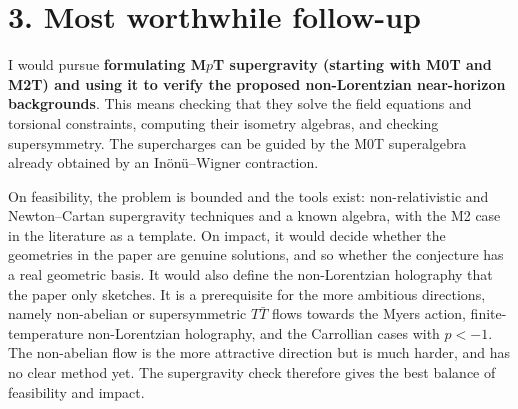 \documentclass[11pt]{article}
\begin{document}
\section*{3. Most worthwhile follow-up}
I would pursue \textbf{formulating M$p$T supergravity (starting with M0T and M2T) and using it to verify the proposed non-Lorentzian near-horizon backgrounds}. This means checking that they solve the field equations and torsional constraints, computing their isometry algebras, and checking supersymmetry. The supercharges can be guided by the M0T superalgebra already obtained by an In\"on\"u--Wigner contraction.

On feasibility, the problem is bounded and the tools exist: non-relativistic and Newton--Cartan supergravity techniques and a known algebra, with the M2 case in the literature as a template. On impact, it would decide whether the geometries in the paper are genuine solutions, and so whether the conjecture has a real geometric basis. It would also define the non-Lorentzian holography that the paper only sketches. It is a prerequisite for the more ambitious directions, namely non-abelian or supersymmetric $T\bar T$ flows towards the Myers action, finite-temperature non-Lorentzian holography, and the Carrollian cases with $p<-1$. The non-abelian flow is the more attractive direction but is much harder, and has no clear method yet. The supergravity check therefore gives the best balance of feasibility and impact.
\end{document}
